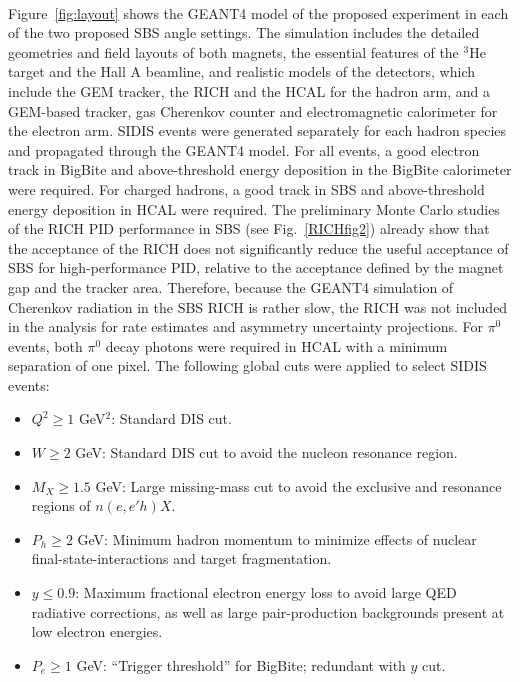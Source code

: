 \paragraph{}
Figure~\ref{fig:layout} shows the GEANT4 model of the proposed experiment in each of the two proposed SBS angle settings. The simulation includes the detailed geometries and field layouts of both magnets, the essential features of the $^3$He target and the Hall A beamline, and realistic models of the detectors, which include the GEM tracker, the RICH and the HCAL for the hadron arm, and a GEM-based tracker, gas Cherenkov counter and electromagnetic calorimeter for the electron arm. SIDIS events were generated separately for each hadron species and propagated through the GEANT4 model. For all events, a good electron track in BigBite and above-threshold energy deposition in the BigBite calorimeter were required. For charged hadrons, a good track in SBS and above-threshold energy deposition in HCAL were required. The preliminary Monte Carlo studies of the RICH PID performance in SBS (see Fig.~\ref{RICHfig2}) already show that the acceptance of the RICH does not significantly reduce the useful acceptance of SBS for high-performance PID, relative to the acceptance defined by the magnet gap and the tracker area. Therefore, because the GEANT4 simulation of Cherenkov radiation in the SBS RICH is rather slow, the RICH was not included in the analysis for rate estimates and asymmetry uncertainty projections.  For $\pi^0$ events, both $\pi^0$ decay photons were required in HCAL with a minimum separation of one pixel. The following global cuts were applied to select SIDIS events:
\begin{itemize}
\item $Q^2 \ge 1$ GeV$^2$: Standard DIS cut. 
\item $W \ge 2$ GeV: Standard DIS cut to avoid the nucleon resonance region.
\item $M_X \ge 1.5$ GeV: Large missing-mass cut to avoid the exclusive and resonance regions of $n(e,e'h)X$.
\item $P_h \ge 2$ GeV: Minimum hadron momentum to minimize effects of nuclear final-state-interactions and target fragmentation.
\item $y \le 0.9$: Maximum fractional electron energy loss to avoid large QED radiative corrections, as well as large pair-production backgrounds present at low electron energies.
\item $P_e \ge 1$ GeV: ``Trigger threshold'' for BigBite; redundant with $y$ cut. 
\end{itemize}
